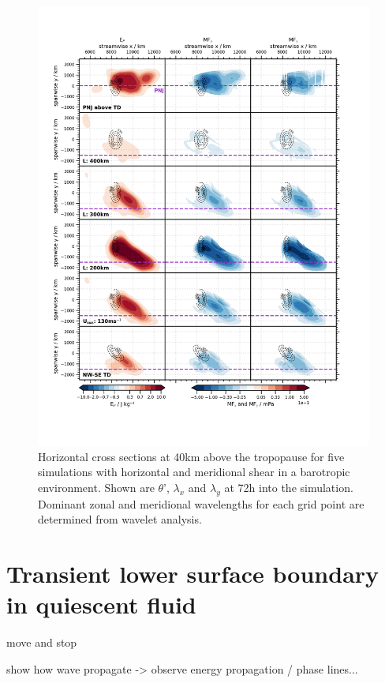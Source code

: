 \begin{figure}[tbp]
    \centering
    \includegraphics[width=0.99\textwidth]{figures_3D/waveletAna_fluxes_obs.png}
    \caption{Horizontal cross sections at 40km above the tropopause for five simulations with horizontal and meridional shear in a barotropic environment. Shown are $\theta$', $\lambda_x$ and $\lambda_y$ at 72h into the simulation. Dominant zonal and meridional wavelengths for each grid point are determined from wavelet analysis.}
    \label{fig:waveletAna_dudy}
\end{figure}


\section{Transient lower surface boundary in quiescent fluid}

move and stop 

show how wave propagate -> observe energy propagation / phase lines... 


